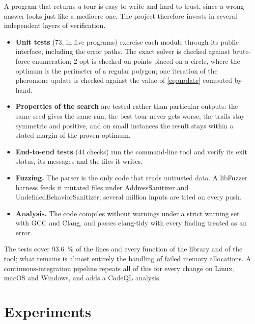 \documentclass[11pt,a4paper]{article}
\begin{document}
A program that returns \emph{a} tour is easy to write and hard to trust, since a wrong
answer looks just like a mediocre one. The project therefore invests in several
independent layers of verification.

\begin{itemize}
    \item \textbf{Unit tests} (73, in five programs) exercise each module through its public
          interface, including the error paths. The exact solver is checked against brute-force
          enumeration; 2-opt is checked on points placed on a circle, where the optimum is the
          perimeter of a regular polygon; one iteration of the pheromone update is checked
          against the value of \cref{eq:update} computed by hand.
    \item \textbf{Properties of the search} are tested rather than particular outputs: the
          same seed gives the same run, the best tour never gets worse, the trails stay
          symmetric and positive, and on small instances the result stays within a stated margin
          of the proven optimum.
    \item \textbf{End-to-end tests} (44 checks) run the command-line tool and verify its
          exit status, its messages and the files it writes.
    \item \textbf{Fuzzing.} The parser is the only code that reads untrusted data. A
          libFuzzer harness feeds it mutated files under AddressSanitizer and
          UndefinedBehaviorSanitizer; several million inputs are tried on every push.
    \item \textbf{Analysis.} The code compiles without warnings under a strict warning set
          with GCC and Clang, and passes clang-tidy with every finding treated as an error.
\end{itemize}

The tests cover \SI{93.6}{\percent} of the lines and every function of the library and of
the tool; what remains is almost entirely the handling of failed memory allocations. A
continuous-integration pipeline repeats all of this for every change on Linux, macOS and
Windows, and adds a CodeQL analysis.

\section{Experiments}
\label{sec:experiments}
\end{document}

